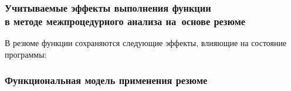 \documentclass[10pt,gray]{beamer}
\begin{document}

\begin{frame}
\frametitle{Учитываемые эффекты выполнения функции\\в методе межпроцедурного анализа на~основе резюме}
В резюме функции сохраняются следующие эффекты, влияющие на состояние программы:
\begin{figure}[h]
\end{figure}
\end{frame}

\begin{frame}
\frametitle{Функциональная модель применения резюме}
\begin{figure}[h]
\end{figure}
\end{frame}
\end{document}

